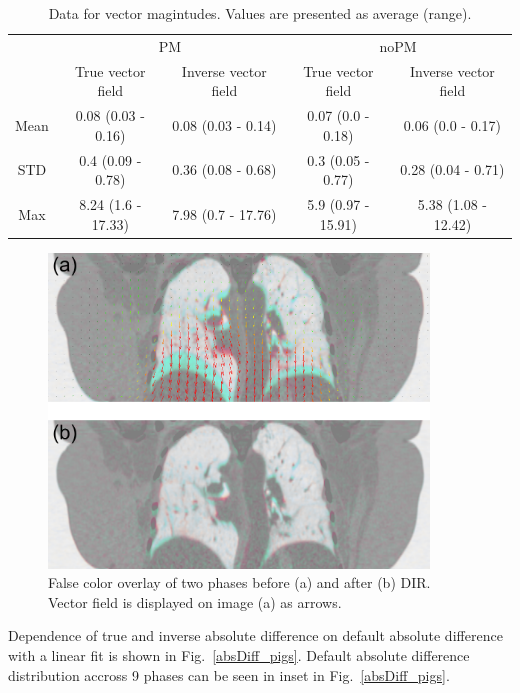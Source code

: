 \documentclass[type=dr, dr=rernat, accentcolor=tud7b,colorbacktitle, bigchapter, openright, twoside, 12pt ]{tudthesis}
\begin{document}
\begin{table}[H]
  \centering
  \caption{Data for vector magintudes. Values are presented as average (range).}
  \begin{tabular}{c|c|c|c|c}
	    & \multicolumn{2}{|c|}{PM} & \multicolumn{2}{|c|}{noPM} \\
  
            & True vector field   & Inverse vector field   & True vector field  & Inverse vector field \\
       \hline
	Mean & 0.08 (0.03 - 0.16) & 0.08 (0.03 - 0.14) & 0.07 (0.0 - 0.18)  & 0.06 (0.0 - 0.17) \\ 
	STD  & 0.4 (0.09 - 0.78)  & 0.36 (0.08 - 0.68) & 0.3 (0.05 - 0.77)  & 0.28 (0.04 - 0.71) \\ 
	Max  & 8.24 (1.6 - 17.33) & 7.98 (0.7 - 17.76) & 5.9 (0.97 - 15.91) & 5.38 (1.08 - 12.42) \\ 
    \hline\hline
  \end{tabular}
  \label{tab:vectordata_pig}
\end{table}

\begin{figure}[H]
	\begin{center}		
		\includegraphics[width=0.9\textwidth]{./Images/exampleReg.png}
		\caption{False color overlay of two phases before (a) and after (b) DIR. Vector field is displayed on image (a) as arrows.}
		\label{exampleReg_pigs}
	\end{center}
\end{figure}

Dependence of true and inverse absolute difference on default absolute difference with a linear fit is shown in Fig.~\ref{absDiff_pigs}. Default absolute difference distribution accross 9 phases can be seen in inset in Fig.~\ref{absDiff_pigs}.
\end{document}
